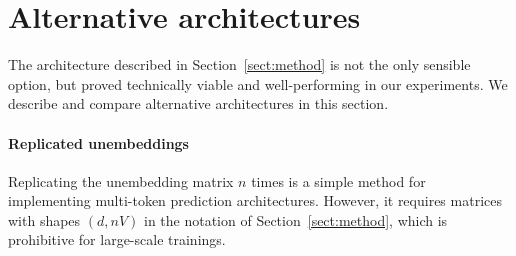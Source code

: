 \documentclass{article}
\theoremstyle{plain}
\theoremstyle{definition}
\theoremstyle{remark}
\begin{document}
\newpage

\section{Alternative architectures}
\label{app:architecture}
\begin{table}[ht!]
    \centering
\caption{\textbf{Alternative architectures improve on baseline but not as consistently.} Alternative architectures for multi-token prediction are worth exploring to improve efficiency. Here we tried Anticausal, causal and linear and showed no significant improvement with respect to Parallel architecture.}
\label{tab:extra_archs}
\end{table}

The architecture described in Section~\ref{sect:method} is not the only sensible option, but proved technically viable and well-performing in our experiments. We describe and compare alternative architectures in this section.
\paragraph{Replicated unembeddings}
Replicating the unembedding matrix $n$ times is a simple method for implementing multi-token prediction architectures. However, it requires matrices with shapes $(d, nV)$ in the notation of Section~\ref{sect:method}, which is prohibitive for large-scale trainings. 
\end{document}
